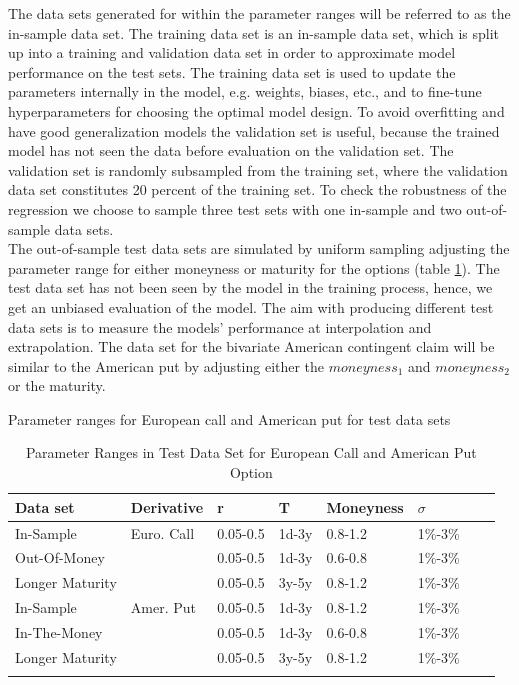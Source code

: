 The data sets generated for within the parameter ranges will be referred to as the in-sample data set. The training data set is an in-sample data set, which is split up into a training and validation data set in order to approximate model performance on the test sets. The training data set is used to update the parameters internally in the model, e.g. weights, biases, etc., and to fine-tune hyperparameters for choosing the optimal model design. To avoid overfitting and have good generalization models the validation set is useful, because the trained model has not seen the data before evaluation on the validation set. The validation set is randomly subsampled from the training set, where the validation data set constitutes 20 percent of the training set. To check the robustness of the regression we choose to sample three test sets with one in-sample and two out-of-sample data sets. \\

The out-of-sample test data sets are simulated by uniform sampling adjusting the parameter range for either moneyness or maturity for the options (table \ref{tab:totalVanillaParRange}). The test data set has not been seen by the model in the training process, hence, we get an unbiased evaluation of the model. The aim with producing different test data sets is to measure the models' performance at interpolation and extrapolation. The data set for the bivariate American contingent claim will be similar to the American put by adjusting either the $moneyness_1$ and $moneyness_2$ or the maturity.\\

\begin{table}[th]
\caption{Parameter Ranges in Test Data Set for European Call and American Put Option}{Parameter ranges for European call and American put for test data sets}
\label{tab:totalVanillaParRange}
\centering
\begin{tabular}{l l l l l l l l }
\toprule
\textbf{Data set} & Derivative  & \textbf{r} & \textbf{T} & \textbf{Moneyness} & \textbf{$\sigma$} \\
\midrule
In-Sample & Euro. Call & 0.05-0.5 & 1d-3y & 0.8-1.2 & 1\%-3\%\\ 
Out-Of-Money & & 0.05-0.5 & 1d-3y & 0.6-0.8 & 1\%-3\%\\
Longer Maturity & & 0.05-0.5 & 3y-5y & 0.8-1.2 & 1\%-3\%\\
In-Sample & Amer. Put & 0.05-0.5 & 1d-3y & 0.8-1.2 & 1\%-3\%\\ 
In-The-Money & & 0.05-0.5 & 1d-3y & 0.6-0.8 & 1\%-3\%\\
Longer Maturity & & 0.05-0.5 & 3y-5y & 0.8-1.2 & 1\%-3\%\\
\bottomrule\\
\end{tabular}
\end{table}

